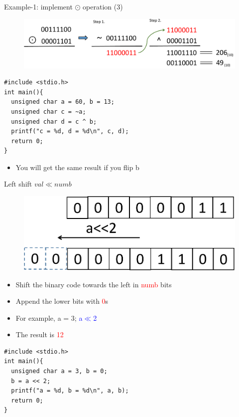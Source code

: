 \begin{frame}[fragile]{Example-1: implement $\odot$ operation (3)}
\vspace{-0.15in}
\begin{figure}
\begin{center}
	\includegraphics[width=0.95\linewidth]{figs/hor.pdf}
\end{center}
\end{figure}
\vspace{-0.15in}
\begin{lstlisting}[linewidth=0.7\linewidth]
#include <stdio.h>
int main(){
  unsigned char a = 60, b = 13;
  unsigned char c = ~a;
  unsigned char d = c ^ b;
  printf("c = %d, d = %d\n", c, d);
  return 0;
}
\end{lstlisting}
\vspace{-0.15in}
\begin{itemize}
	\item {You will get the same result if you flip b}
\end{itemize}
\end{frame}


\begin{frame}[fragile]{Left shift $val{\ll}numb$}
\vspace{-0.15in}
\begin{figure}
\begin{center}
	\includegraphics[width=0.5\linewidth]{figs/lshift.pdf}
\end{center}
\end{figure}
\begin{itemize}
	\item {Shift the binary code towards the left in \textcolor{red}{numb} bits}
	\item {Append the lower bits with \textcolor{red}{0}s}
	\item {For example, a = 3; \textcolor{blue}{a$\ll$2}}
	\item {The result is \textcolor{red}{12}}
\end{itemize}
\begin{lstlisting}[linewidth=0.7\linewidth]
#include <stdio.h>
int main(){
  unsigned char a = 3, b = 0;
  b = a << 2;
  printf("a = %d, b = %d\n", a, b);
  return 0;
}
\end{lstlisting}
\end{frame}



